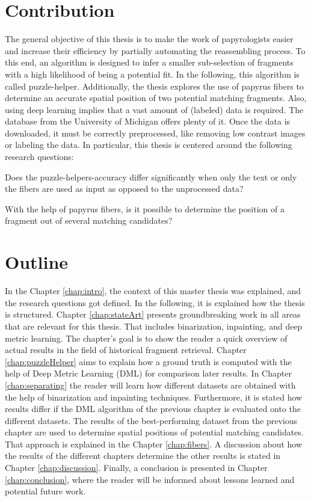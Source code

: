 \section{Contribution}
The general objective of this thesis is to make the work of papyrologists easier and increase their efficiency
by partially automating the reassembling process. To this end, an algorithm is designed to infer a
smaller sub-selection of fragments with a high likelihood of being a potential fit. In the following, this
algorithm is called puzzle-helper. Additionally, the thesis explores the use of papyrus fibers to determine an accurate spatial position of two potential matching fragments. Also, using deep learning implies that a vast amount of (labeled) data is required. The database from the University of Michigan offers plenty of it. Once the data is downloaded, it must be correctly preprocessed, like removing low contrast images or labeling the data. In particular, this thesis is centered around the following research questions:
\begin{questions}
	\item  Does the puzzle-helpers-accuracy differ significantly when only the text or only the fibers are used as input as opposed to the unprocessed data?	
	\item  With the help of papyrus fibers, is it possible to determine the position of a fragment out of several matching candidates?	
\end{questions}


\section{Outline}
In the Chapter \ref{chap:intro}, the context of this master thesis was explained, and the research questions got defined. In the following, it is explained how the thesis is structured. Chapter \ref{chap:stateArt} presents groundbreaking work in all areas that are relevant for this thesis. That includes binarization, inpainting, and deep metric learning. The chapter's goal is to show the reader a quick overview of actual results in the field of historical fragment retrieval. Chapter \ref{chap:puzzleHelper} aims to explain how a ground truth is computed with the help of Deep Metric Learning (DML) for comparison later results. In Chapter \ref{chap:separating} the reader will learn how different datasets are obtained with the help of binarization and inpainting techniques. Furthermore, it is stated how results differ if the DML algorithm of the previous chapter is evaluated onto the different datasets. The results of the best-performing dataset from the previous chapter are used to determine spatial positions of potential matching candidates. That approach is explained in the Chapter \ref{chap:fibers}. A discussion about how the results of the different chapters determine the other results is stated in Chapter \ref{chap:discussion}. Finally, a conclusion is presented in Chapter \ref{chap:conclusion}, where the reader will be informed about lessons learned and potential future work.